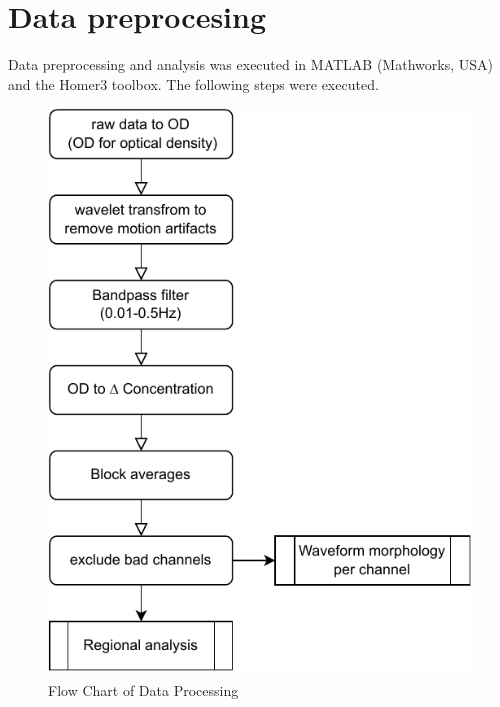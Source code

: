 \section {Data preprocesing}
Data preprocessing and analysis was executed in MATLAB (Mathworks, USA) and the Homer3 toolbox. The following steps were executed.

\begin{figure}[H]
  \centering
    \includegraphics[scale=.8]{pdf/flowchart2.pdf}
  \caption{Flow Chart of Data Processing}
  \label{fig:somesignal}
\end{figure}


